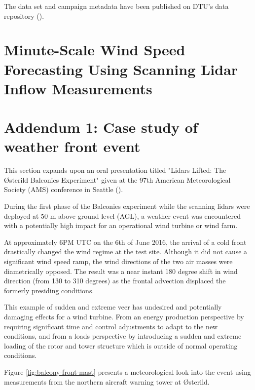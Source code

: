 \noindent
The data set and campaign metadata have been published on DTU's data repository (\cite{balcony_dataset}).

\clearpage
\section{Minute-Scale Wind Speed Forecasting Using Scanning Lidar Inflow Measurements}
\label{sec:balcony_paper}



\clearpage
\section{Addendum 1: Case study of weather front event}
\label{sec:balcony_addendum1}

This section expands upon an oral presentation titled "Lidars Lifted: The {\O}sterild Balconies Experiment" given at the 97th American Meteorological Society (AMS) conference in Seattle (\cite{simon_lidars_lifted_2017}).

During the first phase of the Balconies experiment while the scanning lidars were deployed at 50 m above ground level (AGL),
a weather event was encountered with a potentially high impact for an operational wind turbine or wind farm.

At approximately 6PM UTC on the 6th of June 2016, the arrival of a cold front drastically changed the wind regime at the test site. Although it did not cause a significant wind speed ramp, the wind directions of the two air masses were diametrically opposed. The result was a near instant 180 degree shift in wind direction (from 130 to 310 degrees) as the frontal advection displaced the formerly presiding conditions. 

This example of sudden and extreme veer has undesired and potentially damaging effects for a wind turbine. From an energy production perspective by requiring significant time and control adjustments to adapt to the new conditions, and from a loads perspective by introducing a sudden and extreme loading of the rotor and tower structure which is outside of normal operating conditions.

Figure \ref{fig:balcony-front-mast} presents a meteorological look into the event using measurements from the northern aircraft warning tower at {\O}sterild.

